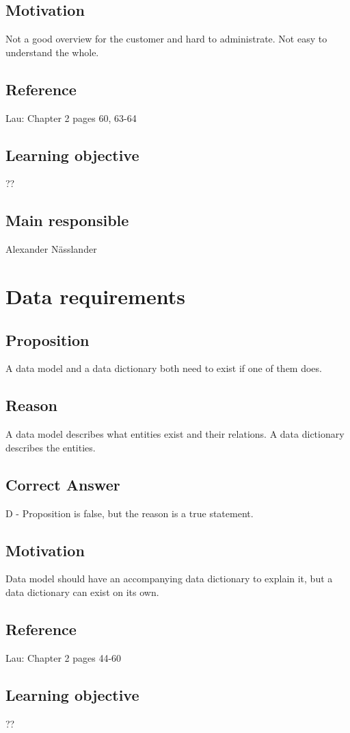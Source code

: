 \documentclass[a4paper]{article}
\begin{document}
\subsection*{Motivation}
Not a good overview for the customer and hard to administrate. Not easy to understand the whole.
\subsection*{Reference}
Lau: Chapter 2 pages 60, 63-64
\subsection*{Learning objective}
??
\subsection*{Main responsible}
Alexander Nässlander


\section{Data requirements}
\subsection*{Proposition}
A data model and a data dictionary both need to exist if one of them does.
\subsection*{Reason}
A data model describes what entities exist and their relations. A data dictionary describes the entities.
\subsection*{Correct Answer}
D - Proposition is false, but the reason is a true statement.
\subsection*{Motivation}
Data model should have an accompanying data dictionary to explain it, but a data dictionary can exist on its own.
\subsection*{Reference}
Lau: Chapter 2 pages 44-60
\subsection*{Learning objective}
??
\end{document}
